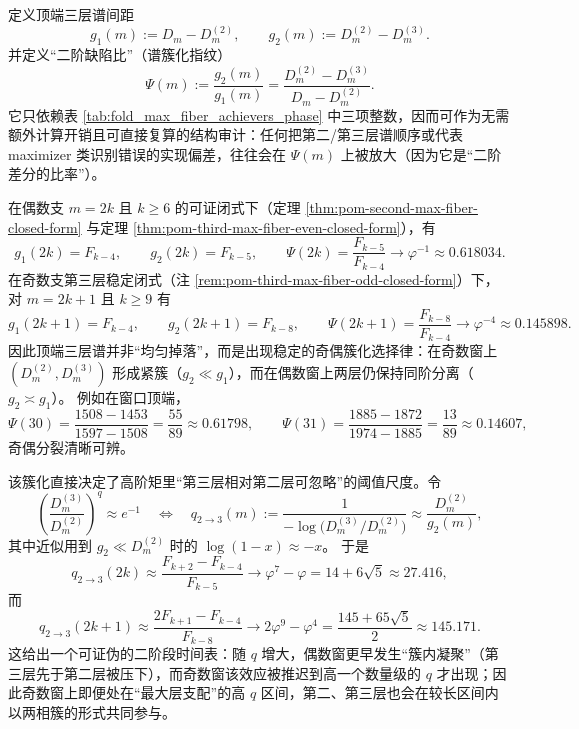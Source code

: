 \begin{remark}\label{rem:pom-spectrum-gap-ratio-fingerprint}
定义顶端三层谱间距
\[
g_{1}(m):=D_m-D_m^{(2)},
\qquad
g_{2}(m):=D_m^{(2)}-D_m^{(3)}.
\]
并定义“二阶缺陷比”（谱簇化指纹）
\[
\Psi(m):=\frac{g_2(m)}{g_1(m)}
=\frac{D_m^{(2)}-D_m^{(3)}}{D_m-D_m^{(2)}}.
\]
它只依赖表 \ref{tab:fold_max_fiber_achievers_phase} 中三项整数，因而可作为无需额外计算开销且可直接复算的结构审计：任何把第二/第三层谱顺序或代表 maximizer 类识别错误的实现偏差，往往会在 \(\Psi(m)\) 上被放大（因为它是“二阶差分的比率”）。
\par
在偶数支 \(m=2k\) 且 \(k\ge 6\) 的可证闭式下（定理 \ref{thm:pom-second-max-fiber-closed-form} 与定理 \ref{thm:pom-third-max-fiber-even-closed-form}），有
\[
g_1(2k)=F_{k-4},\qquad g_2(2k)=F_{k-5},
\qquad
\Psi(2k)=\frac{F_{k-5}}{F_{k-4}}
\longrightarrow \varphi^{-1}\approx 0.618034.
\]
在奇数支第三层稳定闭式（注 \ref{rem:pom-third-max-fiber-odd-closed-form}）下，对 \(m=2k+1\) 且 \(k\ge 9\) 有
\[
g_1(2k+1)=F_{k-4},\qquad g_2(2k+1)=F_{k-8},
\qquad
\Psi(2k+1)=\frac{F_{k-8}}{F_{k-4}}
\longrightarrow \varphi^{-4}\approx 0.145898.
\]
因此顶端三层谱并非“均匀掉落”，而是出现稳定的奇偶簇化选择律：在奇数窗上 \((D_m^{(2)},D_m^{(3)})\) 形成紧簇（\(g_2\ll g_1\)），而在偶数窗上两层仍保持同阶分离（\(g_2\asymp g_1\)）。
例如在窗口顶端，
\[
\Psi(30)=\frac{1508-1453}{1597-1508}=\frac{55}{89}\approx 0.61798,\qquad
\Psi(31)=\frac{1885-1872}{1974-1885}=\frac{13}{89}\approx 0.14607,
\]
奇偶分裂清晰可辨。
\par
该簇化直接决定了高阶矩里“第三层相对第二层可忽略”的阈值尺度。令
\[
\left(\frac{D_m^{(3)}}{D_m^{(2)}}\right)^q\approx e^{-1}
\quad\Longleftrightarrow\quad
q_{2\to3}(m):=\frac{1}{-\log\!\bigl(D_m^{(3)}/D_m^{(2)}\bigr)}
\approx \frac{D_m^{(2)}}{g_2(m)},
\]
其中近似用到 \(g_2\ll D_m^{(2)}\) 时的 \(\log(1-x)\approx -x\)。
于是
\[
q_{2\to3}(2k)\approx \frac{F_{k+2}-F_{k-4}}{F_{k-5}}
\longrightarrow \varphi^7-\varphi=14+6\sqrt5\approx 27.416,
\]
而
\[
q_{2\to3}(2k+1)\approx \frac{2F_{k+1}-F_{k-4}}{F_{k-8}}
\longrightarrow 2\varphi^9-\varphi^4=\frac{145+65\sqrt5}{2}\approx 145.171.
\]
这给出一个可证伪的二阶段时间表：随 \(q\) 增大，偶数窗更早发生“簇内凝聚”（第三层先于第二层被压下），而奇数窗该效应被推迟到高一个数量级的 \(q\) 才出现；因此奇数窗上即便处在“最大层支配”的高 \(q\) 区间，第二、第三层也会在较长区间内以两相簇的形式共同参与。
\end{remark}

